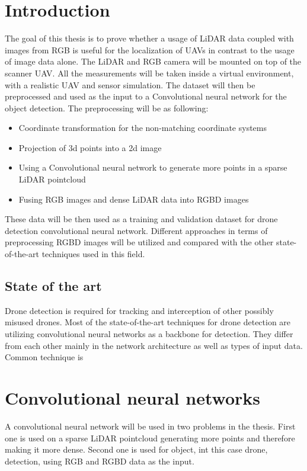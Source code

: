 \documentclass[twoside]{ctuthesis}
\theoremstyle{plain}
\theoremstyle{definition}
\theoremstyle{note}
\begin{document}
\maketitle
\chapter{Introduction}
The goal of this thesis is to prove whether a usage of LiDAR data coupled with images from RGB is useful for the localization of UAVs in contrast to the usage of image data alone. The LiDAR and RGB camera will be mounted on top of the scanner UAV. All the measurements will be taken inside a virtual environment, with a realistic UAV and sensor simulation. The dataset will then be preprocessed and used as the input to a Convolutional neural network for the object detection. The preprocessing will be as following:
\begin{itemize}
	\item Coordinate transformation for the non-matching coordinate systems
	\item Projection of 3d points into a 2d image
	\item Using a Convolutional neural network to generate more points in a sparse LiDAR pointcloud
	\item Fusing RGB images and dense LiDAR data into RGBD images
\end{itemize}
These data will be then used as a training and validation dataset for drone detection convolutional neural network. Different approaches in terms of preprocessing RGBD images will be utilized and compared with the other state-of-the-art techniques used in this field.
\pagebreak
\section{State of the art}
Drone detection is required for tracking and interception of other possibly misused drones. Most of the state-of-the-art techniques for drone detection are utilizing convolutional neural networks as a backbone for detection. They differ from each other mainly in the network architecture as well as types of input data. \newline
\newline
Common technique is 
\chapter{Convolutional neural networks}
A convolutional neural network will be used in two problems in the thesis. First one is used on a sparse LiDAR pointcloud generating more points and therefore making it more dense. Second one is used for object, int this case drone, detection, using RGB and RGBD data as the input.
\end{document}
